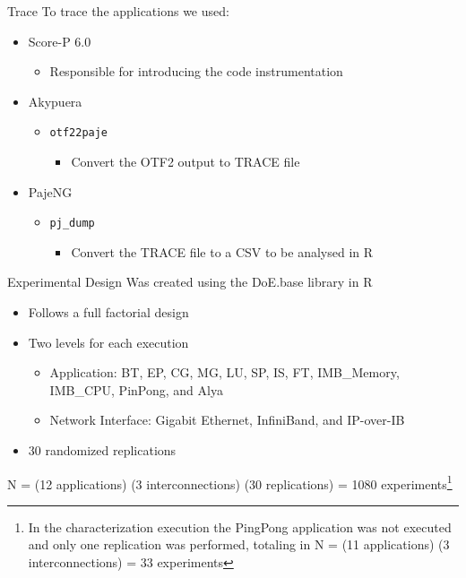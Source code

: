 \documentclass{beamer}
\begin{document}
\begin{frame}{Trace}
To trace the applications we used: 
    \pause \vfill
    \begin{itemize}
        \item Score-P 6.0
        \begin{itemize}
            \item Responsible for introducing the code instrumentation
        \end{itemize}
    \pause \vfill
        \item Akypuera
        \begin{itemize}
            \item \texttt{otf22paje}
                \begin{itemize}
                    \item Convert the OTF2 output to TRACE file
                \end{itemize}
        \end{itemize}
    \pause \vfill
        \item PajeNG
        \begin{itemize}
            \item \texttt{pj\_dump}
                \begin{itemize}
                    \item Convert the TRACE file to a CSV to be analysed in R
                \end{itemize}
        \end{itemize}
    \end{itemize}
\end{frame}


\begin{frame}{Experimental Design}
\vfill
Was created using the DoE.base library in R
\begin{itemize}
    \item Follows a full factorial design
    \item Two levels for each execution
 \begin{itemize}
\item Application: \alert{BT}, \alert{EP}, \alert{CG}, \alert{MG}, \alert{LU}, \alert{SP}, \alert{IS}, \alert{FT}, \alert{IMB\_Memory}, \alert{IMB\_CPU}, \alert{PinPong}, and \alert{Alya}
\item Network Interface: \alert{Gigabit Ethernet}, \alert{InfiniBand}, and \alert{IP-over-IB}
\end{itemize}
    \item 30 randomized replications
   \end{itemize}
N = (12 applications) \texttimes{} (3 interconnections) \texttimes{} (30 replications) = 1080 experiments\footnote{In the characterization execution the PingPong application was not executed and only one replication was performed, totaling in N = (11 applications) \texttimes{} (3 interconnections) = 33 experiments}   
\vfill
\end{frame}
\end{document}
